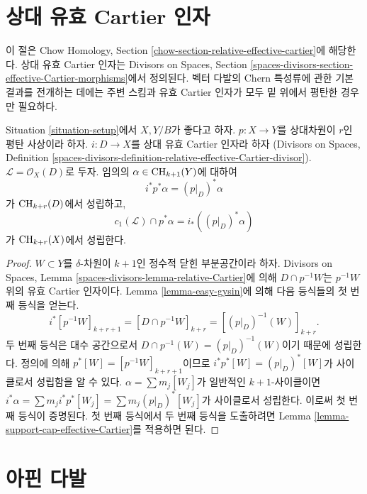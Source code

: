 \section{상대 유효 Cartier 인자}
\label{section-relative-effective-cartier}

\noindent
이 절은 Chow Homology, Section
\ref{chow-section-relative-effective-cartier}에 해당한다.
상대 유효 Cartier 인자는 Divisors on Spaces, Section
\ref{spaces-divisors-section-effective-Cartier-morphisms}에서 정의된다.
벡터 다발의 Chern 특성류에 관한 기본 결과를 전개하는 데에는
주변 스킴과 유효 Cartier 인자가 모두 밑 위에서 평탄한 경우만 필요하다.

\begin{lemma}
\label{lemma-relative-effective-cartier}
Situation \ref{situation-setup}에서 $X, Y/B$가 좋다고 하자.
$p : X \to Y$를 상대차원이 $r$인 평탄 사상이라 하자.
$i : D \to X$를 상대 유효 Cartier 인자라 하자
(Divisors on Spaces, Definition
\ref{spaces-divisors-definition-relative-effective-Cartier-divisor}).
$\mathcal{L} = \mathcal{O}_X(D)$로 두자.
임의의 $\alpha \in \mathop{\mathrm{CH}}\nolimits_{k + 1}(Y)$에 대하여
$$
i^*p^*\alpha = (p|_D)^*\alpha
$$
가 $\mathop{\mathrm{CH}}\nolimits_{k + r}(D)$에서 성립하고,
$$
c_1(\mathcal{L}) \cap p^*\alpha = i_* ((p|_D)^*\alpha)
$$
가 $\mathop{\mathrm{CH}}\nolimits_{k + r}(X)$에서 성립한다.
\end{lemma}

\begin{proof}
$W \subset Y$를 $\delta$-차원이 $k + 1$인 정수적 닫힌 부분공간이라 하자.
Divisors on Spaces, Lemma
\ref{spaces-divisors-lemma-relative-Cartier}에 의해
$D \cap p^{-1}W$는 $p^{-1}W$ 위의 유효 Cartier 인자이다.
Lemma \ref{lemma-easy-gysin}에 의해 다음 등식들의 첫 번째 등식을 얻는다.
$$
i^*[p^{-1}W]_{k + r + 1} =
[D \cap p^{-1}W]_{k + r} =
[(p|_D)^{-1}(W)]_{k + r}.
$$
두 번째 등식은 대수 공간으로서
$D \cap p^{-1}(W) = (p|_D)^{-1}(W)$이기 때문에 성립한다.
정의에 의해 $p^*[W] = [p^{-1}W]_{k + r + 1}$이므로
$i^*p^*[W] = (p|_D)^*[W]$가 사이클로서 성립함을 알 수 있다.
$\alpha = \sum m_j[W_j]$가 일반적인 $k + 1$-사이클이면
$i^*\alpha = \sum m_j i^*p^*[W_j] = \sum m_j(p|_D)^*[W_j]$가
사이클로서 성립한다.
이로써 첫 번째 등식이 증명된다.
첫 번째 등식에서 두 번째 등식을 도출하려면 Lemma
\ref{lemma-support-cap-effective-Cartier}를 적용하면 된다.
\end{proof}

\section{아핀 다발}
\label{section-affine-vector}

